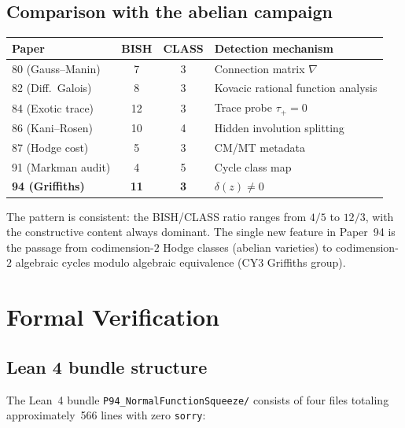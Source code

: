 \documentclass[11pt]{article}
\theoremstyle{plain}
\theoremstyle{definition}
\theoremstyle{remark}
\begin{document}
\subsection{Comparison with the abelian campaign}

\begin{center}
\renewcommand{\arraystretch}{1.2}
\begin{tabular}{@{}lccl@{}}
\toprule
\textbf{Paper} & \textbf{BISH} & \textbf{CLASS} & \textbf{Detection mechanism} \\
\midrule
80 (Gauss--Manin)       & 7 & 3 & Connection matrix $\nabla$ \\
82 (Diff.\ Galois)      & 8 & 3 & Kovacic rational function analysis \\
84 (Exotic trace)       & 12 & 3 & Trace probe $\tau_+ = 0$ \\
86 (Kani--Rosen)        & 10 & 4 & Hidden involution splitting \\
87 (Hodge cost)         & 5 & 3 & CM/MT metadata \\
91 (Markman audit)      & 4 & 5 & Cycle class map \\
\textbf{94 (Griffiths)} & \textbf{11} & \textbf{3} & $\delta(z) \neq 0$ \\
\bottomrule
\end{tabular}
\end{center}

The pattern is consistent: the BISH/CLASS ratio ranges from $4/5$ to $12/3$, with the constructive content always dominant. The single new feature in Paper~94 is the passage from codimension-$2$ Hodge classes (abelian varieties) to codimension-$2$ algebraic cycles modulo algebraic equivalence (CY3 Griffiths group).


\section{Formal Verification}
\label{sec:lean}

\subsection{Lean 4 bundle structure}

The Lean~4 bundle \texttt{P94\_NormalFunctionSqueeze/} consists of four files totaling approximately~566 lines with zero \texttt{sorry}:
\end{document}
